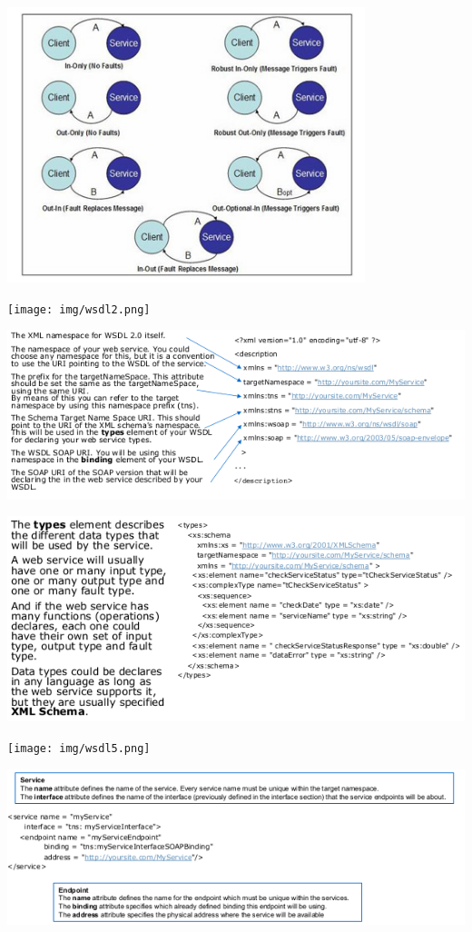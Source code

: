 \documentclass[a4paper,12pt, oneside]{book}
\begin{document}
\begin{center}
\includegraphics[scale=0.7]{img/fault.png}
\end{center}
\begin{shaded}
\begin{center}
\texttt{[image: img/wsdl2.png]}
\end{center}
\begin{center}
\includegraphics[scale=0.6]{img/wsdl3.png}
\end{center}
\begin{center}
\includegraphics[scale=0.6]{img/wsdl4.png}
\end{center}
\begin{center}
\texttt{[image: img/wsdl5.png]}
\end{center}
\begin{center}
\includegraphics[scale=0.6]{img/wsdl6.png}
\end{center}
\end{shaded}
\end{document}
